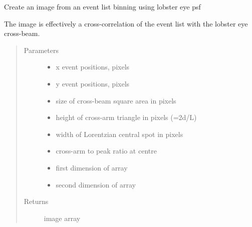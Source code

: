 \documentclass[letterpaper,10pt,english]{sphinxmanual}
\begin{document}

\begin{fulllineitems}
\label{\detokenize{images_functions:images.lebin}}
Create an image from an event list binning using lobster eye psf

The image is effectively a cross-correlation of the event list with the lobster eye cross-beam.
\begin{quote}\begin{description}
\item[{Parameters}] \leavevmode\begin{itemize}
\item {} 
 \textendash{} x event positions, pixels

\item {} 
 \textendash{} y event positions, pixels

\item {} 
 \textendash{} size of cross-beam square area in pixels

\item {} 
 \textendash{} height of cross-arm triangle in pixels (=2d/L)

\item {} 
 \textendash{} width of Lorentzian central spot in pixels

\item {} 
 \textendash{} cross-arm to peak ratio at centre

\item {} 
 \textendash{} first dimension of array

\item {} 
 \textendash{} second dimension of array

\end{itemize}

\item[{Returns}] \leavevmode
image array

\end{description}\end{quote}


\end{fulllineitems}
\end{document}

